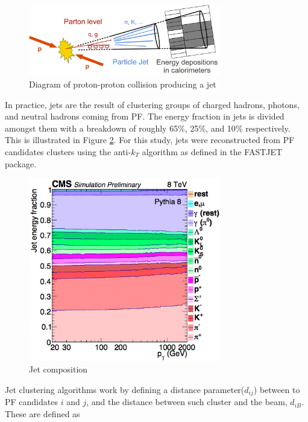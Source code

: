\begin{figure}[h]
  	\label{fig:jets2}
 	\centering
 	\includegraphics[width=0.75\textwidth]{figures/jetsatcmsand.png}
 	\singlespace
 	\caption{Diagram of proton-proton collision producing a jet}
 \end{figure}

In practice, jets are the result of clustering groups of charged hadrons, photons, and neutral hadrons coming from PF. The energy fraction in jets is divided amongst them with a breakdown of roughly 65$\%$, 25$\%$, and 10$\%$ respectively. This is illustrated in Figure \ref{fig:jme}. For this study, jets were reconstructed from PF candidates clusters using the anti-$k_{T}$ algorithm\cite{Cacciari:2008gp} as defined in the FASTJET package\cite{Cacciari:2011ma}.

\begin{figure}[h]
  	\label{fig:jme}
 	\centering
 	\includegraphics[width=0.75\textwidth]{figures/jme.png}
 	\singlespace
 	\caption{Jet composition}
 \end{figure}

 Jet clustering algorithms work by defining a distance parameter($d_{ij}$) between to PF candidates $i$ and $j$, and the distance between such cluster and the beam, $d_{iB}$. These are defined as


